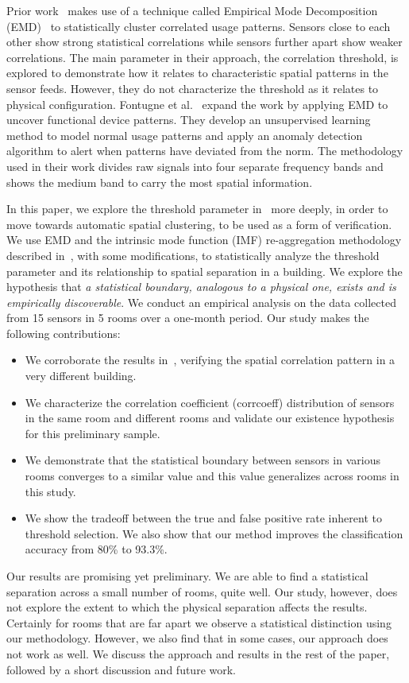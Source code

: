 Prior work~\cite{IOT} makes use of a technique called Empirical Mode Decomposition (EMD)~\cite{EMD} to statistically cluster correlated
usage patterns.  Sensors close to each other show strong statistical correlations while sensors further apart show weaker correlations.  
The main parameter in their approach, the correlation threshold, is explored to demonstrate how it relates to characteristic spatial patterns
 in the sensor feeds.  However, they do not characterize the threshold as it relates to physical configuration.
Fontugne et al.~\cite{SBS} expand the work by applying EMD to uncover functional device patterns.  They develop
an unsupervised learning method to model normal usage patterns and apply an anomaly detection algorithm to alert when patterns
have deviated from the norm.  The methodology used in their work divides raw signals into four separate frequency bands
and shows the medium band to carry the most spatial information. %

In this paper, we explore the threshold parameter in~\cite{IOT} more deeply, in order to move towards automatic spatial clustering, 
to be used as a form of verification. We use EMD and the intrinsic mode function (IMF) re-aggregation methodology described in~\cite{SBS}, with some modifications, to statistically analyze the threshold parameter
and its relationship to spatial separation in a building.  We explore the hypothesis that \emph{a statistical boundary, analogous to a physical one,
exists and is empirically discoverable}.
We conduct an empirical analysis on the data collected from 15 sensors in 5 rooms over a one-month period.  Our study makes the following contributions:

\begin{itemize}
\item We corroborate the results in~\cite{IOT}, verifying the spatial correlation pattern in a very different building.
\item We characterize the correlation coefficient (corrcoeff) distribution of sensors in the same room and different rooms and validate our existence hypothesis for this preliminary sample.
\item We demonstrate that the statistical boundary between sensors in various rooms converges to a similar value and this value generalizes across rooms in this study.
\item We show the tradeoff between the true and false positive rate inherent to threshold selection. We also show that our method improves the classification accuracy from 80\% to 93.3\%.
\end{itemize}

Our results are promising yet preliminary.  We are able to find a statistical separation across a small number of rooms, quite well.
Our study, however, does not explore the extent to which the physical separation affects the results.  Certainly for rooms that
are far apart we observe a statistical distinction using our methodology.  However, we also find that in some cases, our approach
does not work as well.  We discuss the approach and results in the rest of the paper, followed by a short discussion and future work.


